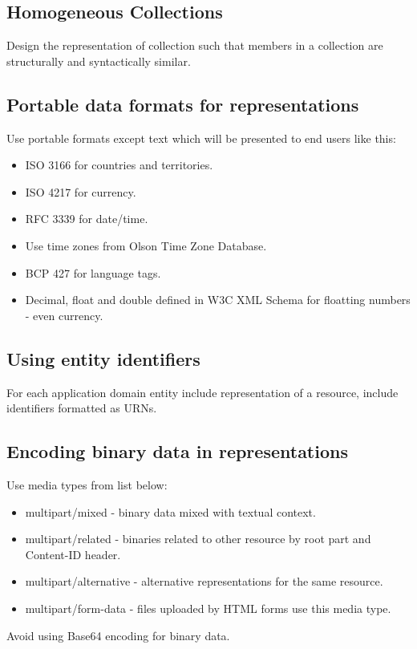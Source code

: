 \documentclass[11pt,a4paper]{article}
\begin{document}
\subsection{Homogeneous Collections}
Design the representation of collection such that members in a collection are structurally and syntactically similar.

\subsection{Portable data formats for representations}
Use portable formats except text which will be presented to end users like this:
\begin{itemize}
	\item ISO 3166 for countries and territories.
	\item ISO 4217 for currency.
	\item RFC 3339 for date/time.
	\item Use time zones from Olson Time Zone Database.
	\item BCP 427 for language tags.
	\item Decimal, float and double defined in W3C XML Schema for floatting numbers - even currency.
\end{itemize}

\subsection{Using entity identifiers}
For each application domain entity include representation of a resource, include identifiers formatted as URNs.

\subsection{Encoding binary data in representations}
Use media types from list below:
\begin{itemize}
	\item multipart/mixed - binary data mixed with textual context.
	\item multipart/related - binaries related to other resource by root part and Content-ID header.
	\item multipart/alternative - alternative representations for the same resource.
	\item multipart/form-data - files uploaded by HTML forms use this media type.
\end{itemize}

Avoid using Base64 encoding for binary data.
\end{document}
